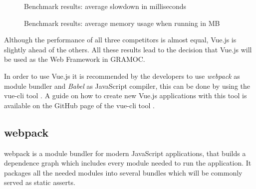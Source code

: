 \begin{figure}[H]
    \centering
    \caption{Benchmark results: average slowdown in milliseconds}
    \label{fig:slowdownresults}
\end{figure}

\begin{figure}[H]
    \centering
    \caption{Benchmark results: average memory usage when running in MB}
    \label{fig:memoryresults}
\end{figure}

Although the performance of all three competitors is almost equal, Vue.js is slightly ahead of the others. All these results lead to the decision that Vue.js will be used as the Web Framework in GRAMOC.

In order to use Vue.js it is recommended by the developers to use \textit{webpack}  as module bundler and \textit{Babel} as JavaScript compiler, this can be done by using the vue-cli tool \autocite{webpack} \autocite{Babel} \autocite{vuecli}. A guide on how to create new Vue.js applications with this tool is available on the GitHub page of the vue-cli tool \autocite{vuecli}.

\subsection{webpack}
webpack is a module bundler for modern JavaScript applications, that builds a dependence graph which includes every module needed to run the application. It packages all the needed modules into several bundles which will be commonly served as static asserts.

